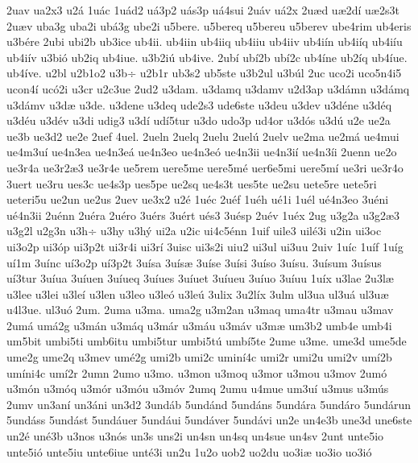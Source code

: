{2uav
ua2x3
u2^^e1
1u^^e1c
1u^^e1d2
u^^e13p2
u^^e1s3p
u^^e14sui
2u^^e1v
u^^e12x
2u^^e6d
u^^e62d^^ed
u^^e62s3t
2u^^e6v
uba3g
uba2i
ub^^e13g
ube2i
u5bere.
u5bereq
u5bereu
u5berev
ube4rim
ub4eris
u3b^^e9re
2ubi
ubi2b
ub3ice
ub4ii.
ub4iin
ub4iiq
ub4iiu
ub4iiv
ub4i^^edn
ub4i^^edq
ub4i^^edu
ub4i^^edv
u3bi^^f3
ub2iq
ub4iue.
u3b2i^^fa
ub4ive.
2ub^^ed
ub^^ed2b
ub^^ed2c
ub4^^edne
ub2^^edq
ub4^^edue.
ub4^^edve.
u2bl
u2b1o2
u3b^^f7
u2b1r
ub3s2
ub5ste
u3b2ul
u3b^^fal
2uc
uco2i
uco5n4i5
ucon4^^ed
uc^^f32i
u3cr
u2c3ue
2ud2
u3dam.
u3damq
u3damv
u2d3ap
u3d^^e1mn
u3d^^e1mq
u3d^^e1mv
u3d^^e6
u3de.
u3dene
u3deq
ude2s3
ude6ste
u3deu
u3dev
u3d^^e9ne
u3d^^e9q
u3d^^e9u
u3d^^e9v
u3di
udig3
u3d^^ed
ud^^ed5tur
u3do
udo3p
ud4or
u3d^^f3s
u3d^^fa
u2e
ue2a
ue3b
ue3d2
ue2e
2uef
4uel.
2ueln
2uelq
2uelu
2uel^^fa
2uelv
ue2ma
ue2m^^e1
ue4mui
ue4m3u^^ed
ue4n3ea
ue4n3e^^e1
ue4n3eo
ue4n3e^^f3
ue4n3ii
ue4n3i^^ed
ue4n3^^edi
2uenn
ue2o
ue3r4a
ue3r2^^e63
ue3r4e
ue5rem
uere5me
uere5m^^e9
uer6e5mi
uere5m^^ed
ue3ri
ue3r4o
3uert
ue3ru
ues3c
ue4s3p
ues5pe
ue2sq
ue4s3t
ues5te
ue2su
uete5re
uete5ri
ueteri5u
ue2un
ue2us
2uev
ue3x2
u2^^e9
1u^^e9c
2u^^e9f
1u^^e9h
u^^e91i
1u^^e9l
u^^e94n3eo
3u^^e9ni
u^^e94n3ii
2u^^e9nn
2u^^e9ra
2u^^e9ro
3u^^e9rs
3u^^e9rt
u^^e9s3
3u^^e9sp
2u^^e9v
1u^^e9x
2ug
u3g2a
u3g2^^e63
u3g2l
u2g3n
u3h^^f7
u3hy
u3h^^fd
ui2a
u2ic
ui4c5^^e9nn
1uif
uile3
uil^^e93i
u2in
ui3oc
ui3o2p
ui3^^f3p
ui3p2t
ui3r4i
ui3r^^ed
3uisc
ui3s2i
uiu2
ui3ul
ui3uu
2uiv
1u^^edc
1u^^edf
1u^^edg
u^^ed1m
3u^^ednc
u^^ed3o2p
u^^ed3p2t
3u^^edsa
3u^^eds^^e6
3u^^edse
3u^^edsi
3u^^edso
3u^^edsu.
3u^^edsum
3u^^edsus
u^^ed3tur
3u^^edua
3u^^eduen
3u^^edueq
3u^^edues
3u^^eduet
3u^^edueu
3u^^eduo
3u^^eduu
1u^^edx
u3lae
2u3l^^e6
u3lee
u3lei
u3le^^ed
u3len
u3leo
u3le^^f3
u3le^^fa
3ulix
3u2l^^edx
3ulm
ul3ua
ul3u^^e1
ul3u^^e6
u4l3ue.
ul3u^^f3
2um.
2uma
u3ma.
uma2g
u3m2an
u3maq
uma4tr
u3mau
u3mav
2um^^e1
um^^e12g
u3m^^e1n
u3m^^e1q
u3m^^e1r
u3m^^e1u
u3m^^e1v
u3m^^e6
um3b2
umb4e
umb4i
um5bit
umbi5ti
umb6itu
umbi5tur
umbi5t^^fa
umb^^ed5te
2ume
u3me.
ume3d
ume5de
ume2g
ume2q
u3mev
um^^e92g
umi2b
umi2c
umin^^ed4c
umi2r
umi2u
umi2v
um^^ed2b
um^^edni4c
um^^ed2r
2umn
2umo
u3mo.
u3mon
u3moq
u3mor
u3mou
u3mov
2um^^f3
u3m^^f3n
u3m^^f3q
u3m^^f3r
u3m^^f3u
u3m^^f3v
2umq
2umu
u4mue
um3u^^ed
u3mus
u3m^^fas
2umv
un3an^^ed
un3^^e1ni
un3d2
3und^^e1b
5und^^e1nd
5und^^e1ns
5und^^e1ra
5und^^e1ro
5und^^e1run
5und^^e1ss
5und^^e1st
5und^^e1uer
5und^^e1ui
5und^^e1ver
5und^^e1vi
un2e
un4e3b
une3d
une6ste
un2^^e9
un^^e93b
u3nos
u3n^^f3s
un3s
uns2i
un4sn
un4sq
un4sue
un4sv
2unt
unte5io
unte5i^^f3
unte5iu
unte6iue
unt^^e93i
un2u
1u2o
uob2
uo2du
uo3i^^e6
uo3io
uo3i^^f3
}
